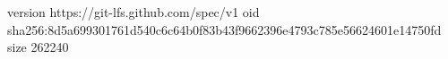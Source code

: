 version https://git-lfs.github.com/spec/v1
oid sha256:8d5a699301761d540c6c64b0f83b43f9662396e4793c785e56624601e14750fd
size 262240
